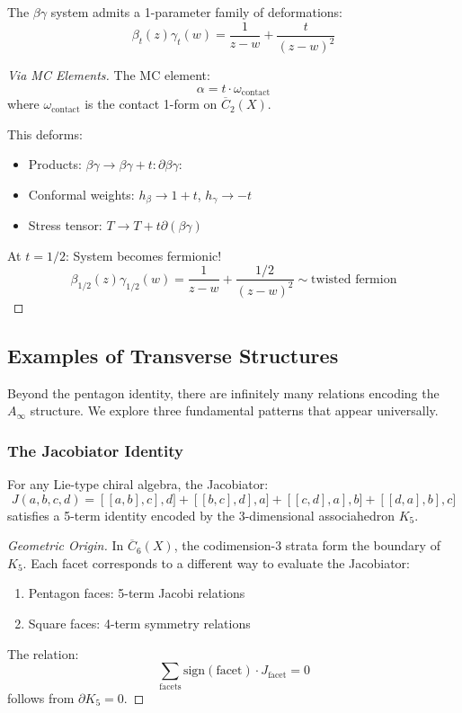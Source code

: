\begin{theorem}
The $\beta\gamma$ system admits a 1-parameter family of deformations:
$$\beta_t(z)\gamma_t(w) = \frac{1}{z-w} + \frac{t}{(z-w)^2}$$
\end{theorem}

\begin{proof}[Via MC Elements]
The MC element:
$$\alpha = t \cdot \omega_{\text{contact}}$$
where $\omega_{\text{contact}}$ is the contact 1-form on $\overline{C}_2(X)$.

This deforms:
\begin{itemize}
\item Products: $\beta\gamma \to \beta\gamma + t:\partial\beta\gamma:$
\item Conformal weights: $h_\beta \to 1 + t$, $h_\gamma \to -t$
\item Stress tensor: $T \to T + t\partial(\beta\gamma)$
\end{itemize}

At $t = 1/2$: System becomes fermionic!
$$\beta_{1/2}(z)\gamma_{1/2}(w) = \frac{1}{z-w} + \frac{1/2}{(z-w)^2} \sim \text{twisted fermion}$$
\end{proof}


\subsection{Examples of Transverse Structures}

Beyond the pentagon identity, there are infinitely many relations encoding the $A_\infty$ structure. We explore three fundamental patterns that appear universally.

\subsubsection{The Jacobiator Identity}

\begin{theorem}
For any Lie-type chiral algebra, the Jacobiator:
$$J(a,b,c,d) = [[a,b],c],d] + [[b,c],d],a] + [[c,d],a],b] + [[d,a],b],c]$$
satisfies a 5-term identity encoded by the 3-dimensional associahedron $K_5$.
\end{theorem}

\begin{proof}[Geometric Origin]
In $\overline{C}_6(X)$, the codimension-3 strata form the boundary of $K_5$. Each facet corresponds to a different way to evaluate the Jacobiator:
\begin{enumerate}
\item Pentagon faces: 5-term Jacobi relations
\item Square faces: 4-term symmetry relations
\end{enumerate}

The relation:
$$\sum_{\text{facets}} \text{sign}(\text{facet}) \cdot J_{\text{facet}} = 0$$
follows from $\partial K_5 = 0$.
\end{proof}

